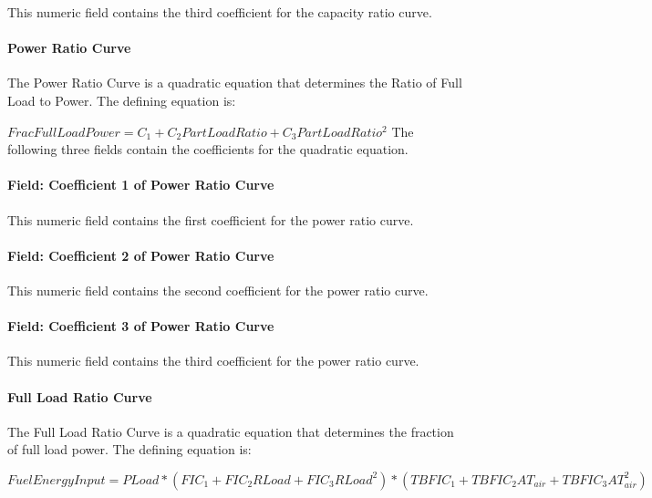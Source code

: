 This numeric field contains the third coefficient for the capacity ratio curve.

\paragraph{Power Ratio Curve}\label{power-ratio-curve-2}

The Power Ratio Curve is a quadratic equation that determines the Ratio of Full Load to Power. The defining equation is:

\(FracFullLoadPower = {C_1} + {C_2}PartLoadRatio + {C_3}PartLoadRati{o^2}\) The following three fields contain the coefficients for the quadratic equation.

\paragraph{Field: Coefficient 1 of Power Ratio Curve}\label{field-coefficient-1-of-power-ratio-curve-1}

This numeric field contains the first coefficient for the power ratio curve.

\paragraph{Field: Coefficient 2 of Power Ratio Curve}\label{field-coefficient-2-of-power-ratio-curve-2}

This numeric field contains the second coefficient for the power ratio curve.

\paragraph{Field: Coefficient 3 of Power Ratio Curve}\label{field-coefficient-3-of-power-ratio-curve-2}

This numeric field contains the third coefficient for the power ratio curve.

\paragraph{Full Load Ratio Curve}\label{full-load-ratio-curve-2}

The Full Load Ratio Curve is a quadratic equation that determines the fraction of full load power. The defining equation is:

\begin{equation}
FuelEnergyInput = PLoad * (FI{C_1} + FI{C_2}RLoad + FI{C_3}RLoa{d^2}) * (TBFI{C_1} + TBFI{C_2}A{T_{air}} + TBFI{C_3}AT_{air}^2)
\end{equation}

